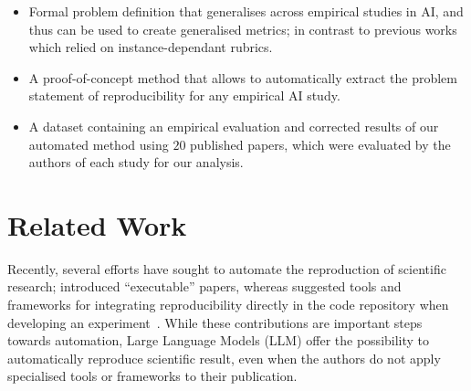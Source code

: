 \documentclass[letterpaper]{article} %
\newcommand{\nbc}[3]{
{\colorbox{#3}{\bfseries\sffamily\scriptsize\textcolor{white}{#1}}}
{\textcolor{#3}{\sf\small$\blacktriangleright$\textit{#2}$\blacktriangleleft$}}
}
\newcommand{\hh}[1]{\nbc{HH}{#1}{red}}
\begin{document}
\begin{itemize}
    \item Formal problem definition that generalises across empirical studies in AI, and thus can be used to create generalised metrics; in contrast to previous works which relied on instance-dependant rubrics.
    \item A proof-of-concept method that allows to automatically extract the problem statement of reproducibility for any empirical AI study.
    \item A dataset containing an empirical evaluation and corrected results of our automated method using $20$ published papers, which were evaluated by the authors of each study for our analysis.
\end{itemize}



\section{Related Work}
\label{sec:related_work}



Recently, several efforts have sought to automate the reproduction of scientific research; \citet{russo_advantages_2016} introduced ``executable'' papers, whereas \citet{brandmaier_automated_2025} suggested tools and frameworks for integrating reproducibility directly in the code repository when developing an experiment~\cite{gavish_universal_2011, jimenez_popperci_2017}. 
While these contributions are important steps towards automation, Large Language Models (LLM) offer the possibility to automatically reproduce scientific result, even when the authors do not 
apply specialised tools or frameworks to their publication. 
\end{document}
